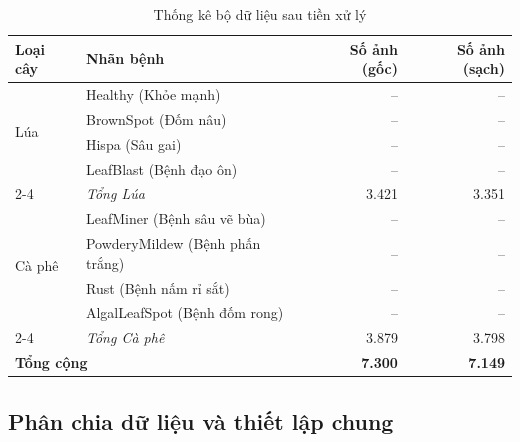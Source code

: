 \begin{table}[H]
    \caption{Thống kê bộ dữ liệu sau tiền xử lý}
    \centering
    \begin{tabular}{llrr}
        \toprule
        \textbf{Loại cây}                      & \textbf{Nhãn bệnh}              & \textbf{Số ảnh (gốc)} & \textbf{Số ảnh (sạch)} \\
        \midrule
        \multirow{4}{*}{Lúa}                   & Healthy (Khỏe mạnh)             & --                    & --                     \\
                                               & BrownSpot (Đốm nâu)             & --                    & --                     \\
                                               & Hispa (Sâu gai)                 & --                    & --                     \\
                                               & LeafBlast (Bệnh đạo ôn)         & --                    & --                     \\
        \cmidrule{2-4}
                                               & \textit{Tổng Lúa}               & 3.421                 & 3.351                  \\
        \midrule
        \multirow{4}{*}{Cà phê}                & LeafMiner (Bệnh sâu vẽ bùa)     & --                    & --                     \\
                                               & PowderyMildew (Bệnh phấn trắng) & --                    & --                     \\
                                               & Rust (Bệnh nấm rỉ sắt)          & --                    & --                     \\
                                               & AlgalLeafSpot (Bệnh đốm rong)   & --                    & --                     \\
        \cmidrule{2-4}
                                               & \textit{Tổng Cà phê}            & 3.879                 & 3.798                  \\
        \midrule
        \multicolumn{2}{l}{\textbf{Tổng cộng}} & \textbf{7.300}                  & \textbf{7.149}                                 \\
        \bottomrule
    \end{tabular}
    \label{tab:dataset_stats}
\end{table}

\subsection{Phân chia dữ liệu và thiết lập chung}

